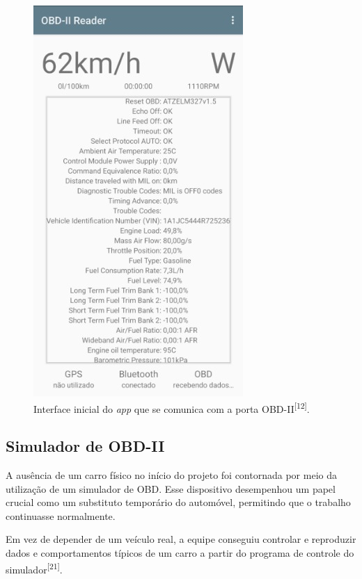     
\begin{figure}[hp]
    \centering
    
    \includegraphics[scale=0.5]{figures/obd2.jpeg}
    
    \caption{Interface inicial do \textit{app} que se comunica com a porta OBD-II\textsuperscript{[12]}.}
    
    \label{fig:obd2_plataforma}
\end{figure}

    \subsection{Simulador de OBD-II}

    A ausência de um carro físico no início do projeto foi contornada por meio da utilização de um simulador de OBD. Esse dispositivo desempenhou um papel crucial como um substituto temporário do automóvel, permitindo que o trabalho continuasse normalmente. 
    
    Em vez de depender de um veículo real, a equipe conseguiu controlar e reproduzir dados e comportamentos típicos de um carro a partir do programa de controle do simulador\textsuperscript{[21]}.

